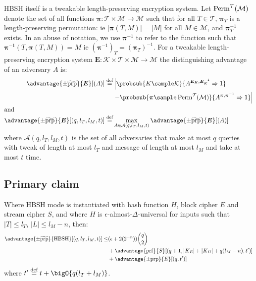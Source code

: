 \documentclass[eprint.tex]{subfiles}
\begin{document}
HBSH itself is a tweakable length-preserving encryption system.
Let $\operatorname{Perm}^\mathcal{T}(\mathcal{M})$ denote the set of all functions
$\bm{\pi} : \mathcal{T} \times \mathcal{M} \rightarrow \mathcal{M}$
such that for all $T \in \mathcal{T}$,
$\bm{\pi}_{T}$ is a length-preserving permutation: ie
$|\bm{\pi}(T, M)| = |M|$ for all $M \in \mathcal{M}$,
and $\bm{\pi}_{T}^{-1}$ exists.
In an abuse of notation, we use $\bm{\pi}^{-1}$ to refer to the function
such that $\bm{\pi}^{-1}(T, \bm{\pi}(T, M)) = M$ ie $(\bm{\pi}^{-1})_T = (\bm{\pi}_T)^{-1}$.
For a tweakable length-preserving encryption system
$\bm{E} : \mathcal{K} \times \mathcal{T} \times \mathcal{M} \rightarrow \mathcal{M}$
the distinguishing advantage of an adversary $A$ is:
%
\begin{align*}
    \advantage{\pm \widetilde{\mathrm{prp}}}{\bm{E}}[(A)] \defeq
    &\left|\probsub{K \sample \mathcal{K}}{A^{\bm{E}_K,\bm{E}_K^{-1}}\Rightarrow 1}\right.
    \\
    &\left. - \probsub{\bm{\pi} \sample \Perm^\mathcal{T}(\mathcal{M})}
        {A^{\bm{\pi},\bm{\pi}^{-1}}\Rightarrow 1}\right|
    \\
\intertext{and}
\advantage{\pm \widetilde{\mathrm{prp}}}{\bm{E}}[(q, l_T, l_M, t)]
\defeq &
\max_{A \in \mathcal{A}(q, l_T, l_M, t)} \advantage{\pm \widetilde{\mathrm{prp}}}{\bm{E}}[(A)]
\end{align*}
%
\begin{displaymath}
\end{displaymath}
where $\mathcal{A}(q, l_T, l_M, t)$
is the set of all adversaries that
make at most $q$ queries
with tweak of length at most $l_T$
and message of length at most $l_M$
and take at most $t$ time.

\subsection{Primary claim}
\begin{theorem}\label{hbshadvantage}
    Where HBSH mode is instantiated with hash function $H$, block cipher $E$ and stream cipher $S$,
    and where $H$ is $\epsilon$-almost-$\Delta$-universal for inputs such that
    $|T| \leq l_T$, $|L| \leq l_M - n$, then:
    \begin{align*}
        \advantage{\pm \widetilde{\mathrm{prp}}}{\HBSH}[(q, l_T, l_M, t)]
        \leq &(\epsilon + 2(2^{-n}))\binom{q}{2} \\
        &+ \advantage{\mathrm{prf}}{S}[(q + 1, |K_E| + |K_H| + q(l_M - n), t')] \\
        &+ \advantage{\pm \mathrm{prp}}{E}[(q, t')]\\
    \end{align*}
    where $t' \defeq t + \bigO{q(l_T + l_M)}$.
\end{theorem}
\end{document}
